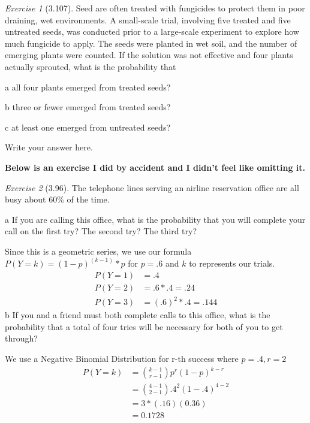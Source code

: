 \documentclass[12pt]{amsart}
\makeatletter
\theoremstyle{remark}
\newtheorem*{exercise}{Exercise}%
\renewenvironment{proof}[1][\proofname]{\par\doublespacing
  \pushQED{\qed}%
  \normalfont \topsep6\p@\@plus6\p@\relax
  \list{}{%
    \settowidth{\leftmargin}{\itshape\proofname:\hskip\labelsep}%
    \setlength{\labelwidth}{0pt}%
    \setlength{\itemindent}{-\leftmargin}%
  }%
  \item[\hskip\labelsep\itshape#1\@addpunct{:}]\ignorespaces
}{%
  \popQED\endlist\@endpefalse
  \singlespacing
}
\theoremstyle{mycomment}
\makeatother
\begin{document}
\begin{exercise}[3.107] 
Seed are often treated with fungicides to protect them in poor draining, wet environments.
A small-scale trial, involving five treated and five untreated seeds, was conducted prior to a
large-scale experiment to explore how much fungicide to apply. The seeds were planted in wet
soil, and the number of emerging plants were counted. If the solution was not effective and
four plants actually sprouted, what is the probability that

a
all four plants emerged from treated seeds?

b
three or fewer emerged from treated seeds?

c
at least one emerged from untreated seeds?
\begin{proof}[Solution]
Write your answer here.
\end{proof}
\end{exercise}

\textbf{Below is an exercise I did by accident and I didn't feel like omitting it.}

\begin{exercise}[3.96]The telephone lines serving an airline reservation office are all busy about 60\% of the time.
  \newline

  a
If you are calling this office, what is the probability that you will complete your call on the
first try? The second try? The third try?
\begin{proof}[Solution]
  Since this is a geometric series, we use our formula $ P(Y=k) = (1-p)^{(k-1)} * p$ for $p = .6$ and $k$ to represents our trials.
  \begin{align*}
    P(Y=1) &= .4  \\
    P(Y=2) &= .6 * .4 = .24 \\
    P(Y=3) &= (.6)^2 * .4 = .144
  \end{align*}
\end{proof}
b
If you and a friend must both complete calls to this office, what is the probability that a
total of four tries will be necessary for both of you to get through?
\begin{proof}[Solution] We use a Negative Binomial Distribution for r-th success where $p=.4, r = 2$
  \begin{align*}
    P(Y = k) &= {k-1 \choose r-1}p^r(1-p)^{k-r} \\
             &= {4-1 \choose 2-1}.4^2(1-.4)^{4-2} \\
             &= 3*(.16)(0.36) \\
             &= 0.1728
  \end{align*}
\end{proof}
\end{exercise}












 
\end{document}
